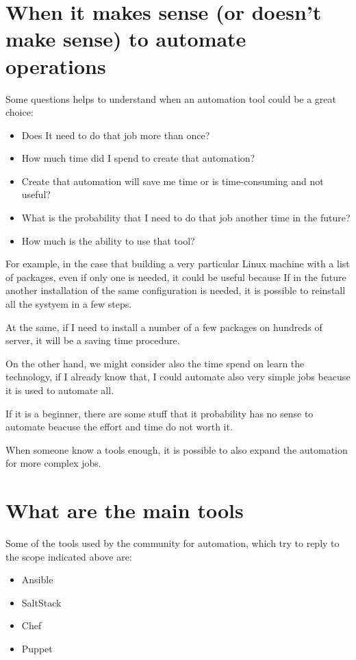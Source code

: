 \documentclass[12pt,a4paper,openright,twoside]{book}
\begin{document}
\section{When it makes sense (or doesn't make sense) to automate operations}
Some questions helps to understand when an automation tool could be a great choice:
\begin{itemize}
    \item Does It need to do that job more than once?
    \item How much time did I spend to create that automation?
    \item Create that automation will save me time or is time-consuming and not useful?
    \item What is the probability that I need to do that job another time in the future?
    \item How much is the ability to use that tool?
\end{itemize}

For example, in the case that building a very particular Linux machine with a list of packages, even if only one is needed, it could be useful because If in the future another installation of the same configuration is needed, it is possible to reinstall all the systyem in a few steps.


At the same, if I need to install a number of a few packages on hundreds of server, it will be a saving time procedure.


On the other hand, we might consider also the time spend on learn the technology, if I already know that, I could automate also very simple jobs beacuse it is used to automate all.


If it is a beginner, there are some stuff that it probability has no sense to automate beacuse the effort and time do not worth it.


When someone know a tools enough, it is possible to also expand the automation for more complex jobs.

\section{What are the main tools}
Some of the tools used by the community for automation, which try to reply to the scope indicated above are:

\begin{itemize}
    \item Ansible
    \item SaltStack
    \item Chef
    \item Puppet
\end{itemize}
\end{document}
